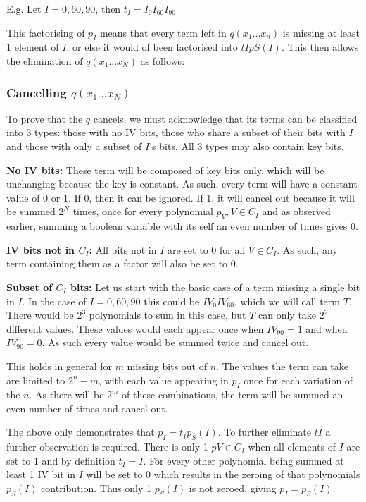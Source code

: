 \documentclass{report}
\let\Oldsubsubsection\subsubsection
\renewcommand{\subsubsection}{\FloatBarrier\Oldsubsubsection}
\begin{document}
E.g. Let $I={0, 60, 90}$, then  $t_I = I_{0}I_{60}I_{90}$

This factorising of $p_I$ means that every term left in $q(x_1...x_n)$ is missing at least 1 element of $I$, or else it would of been factorised into $tIpS(I)$. This then allows the elimination of $q(x_1...x_N)$ as follows:

\subsubsection{Cancelling $q(x_1...x_N)$}
To prove that the $q$ cancels, we must acknowledge that its terms can be classified into 3 types: those with no IV bits, those who share a subset of their bits with $I$ and those with only a subset of $I$'s bits. All 3 types may also contain key bits.

\textbf{No IV bits:}
These term will be composed of key bits only, which will be unchanging because the key is constant. As such, every term will have a constant value of 0 or 1. If 0, then it can be ignored. If 1, it will cancel out because it will be summed $2^N$ times, once for every polynomial $p_V, V \in C_I$ and as observed earlier, summing a boolean variable with its self an even number of times gives 0.

\textbf{IV bits not in $C_I$:}
All bits not in $I$ are set to 0 for all $V \in C_I$. As such, any term containing them as a factor will also be set to 0.

\textbf{Subset of $C_I$ bits:}
Let us start with the basic case of a term missing a single bit in $I$. In the case of $I={0, 60, 90}$ this could be $IV_0IV_{60}$, which we will call term $T$. There would be $2^3$ polynomials to sum in this case, but $T$ can only take $2^2$ different values. These values would each appear once when $IV_{90} = 1$ and when $IV_{90} = 0$. As such every value would be summed twice and cancel out.

This holds in general for $m$ missing bits out of $n$. The values the term can take are limited to $2^n-m$, with each value appearing in $p_I$ once for each variation of the $n$. As there will be $2^m$ of these combinations, the term will be summed an even number of times and cancel out. 

The above only demonstrates that $p_I=t_Ip_S(I)$. To further eliminate $tI$ a further observation is required. There is only 1 $pV \in C_I$ when all elements of $I$ are set to 1 and by definition $t_I=I$. For every other polynomial being summed at least 1 IV bit in $I$ will be set to 0 which results in the zeroing of that polynomials $p_S(I)$ contribution. Thus only 1 $p_S(I)$ is not zeroed, giving $p_I=p_S(I)$.
\end{document}
